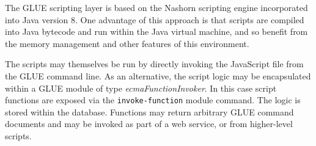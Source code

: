 The GLUE scripting layer is based on the Nashorn scripting engine incorporated
into Java version 8. One advantage of this approach is that scripts are compiled
into Java bytecode and run within the Java virtual machine, and so benefit from
the memory management and other features of this environment.

The scripts may themselves be run by directly invoking the JavaScript file from
the GLUE command line. As an alternative, the script logic may be encapsulated
within a GLUE module of type \emph{ecmaFunctionInvoker}. In this case script
functions are exposed via the \texttt{invoke-function} module command. The logic
is stored within the database. Functions may return arbitrary GLUE command
documents and may be invoked as part of a web service, or from
higher-level scripts.
